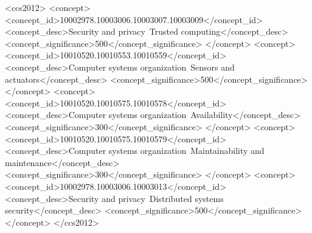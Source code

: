 
\begin{CCSXML}
<ccs2012>
<concept>
<concept_id>10002978.10003006.10003007.10003009</concept_id>
<concept_desc>Security and privacy~Trusted computing</concept_desc>
<concept_significance>500</concept_significance>
</concept>
<concept>
<concept_id>10010520.10010553.10010559</concept_id>
<concept_desc>Computer systems organization~Sensors and actuators</concept_desc>
<concept_significance>500</concept_significance>
</concept>
<concept>
<concept_id>10010520.10010575.10010578</concept_id>
<concept_desc>Computer systems organization~Availability</concept_desc>
<concept_significance>300</concept_significance>
</concept>
<concept>
<concept_id>10010520.10010575.10010579</concept_id>
<concept_desc>Computer systems organization~Maintainability and maintenance</concept_desc>
<concept_significance>300</concept_significance>
</concept>
<concept>
<concept_id>10002978.10003006.10003013</concept_id>
<concept_desc>Security and privacy~Distributed systems security</concept_desc>
<concept_significance>500</concept_significance>
</concept>
</ccs2012>
\end{CCSXML}



